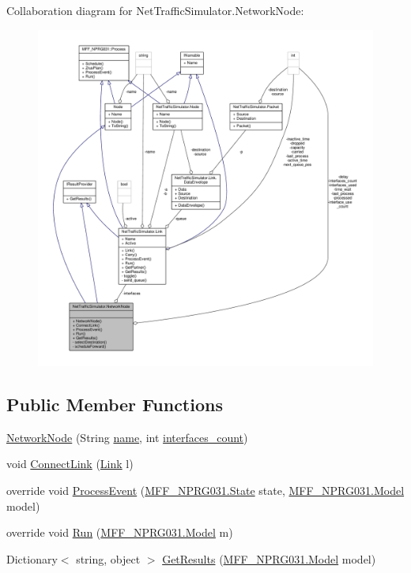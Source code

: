 Collaboration diagram for Net\-Traffic\-Simulator.\-Network\-Node\-:
\nopagebreak
\begin{figure}[H]
\begin{center}
\leavevmode
\includegraphics[width=350pt]{classNetTrafficSimulator_1_1NetworkNode__coll__graph}
\end{center}
\end{figure}
\subsection*{Public Member Functions}
\begin{DoxyCompactItemize}
\item 
\hyperlink{classNetTrafficSimulator_1_1NetworkNode_a72e36bcc5eb67db3e7354a01812fcbd9}{Network\-Node} (String \hyperlink{classNetTrafficSimulator_1_1Node_a679d5b6cca77c0cdb46cc98c347d4747}{name}, int \hyperlink{classNetTrafficSimulator_1_1NetworkNode_af9b9d881f9c1b02749716bb12efb5f66}{interfaces\-\_\-count})
\item 
void \hyperlink{classNetTrafficSimulator_1_1NetworkNode_a03e1d48e53fa9405411664e75792b5ec}{Connect\-Link} (\hyperlink{classNetTrafficSimulator_1_1Link}{Link} l)
\item 
override void \hyperlink{classNetTrafficSimulator_1_1NetworkNode_a4a629c1d159d4addef85742089506d20}{Process\-Event} (\hyperlink{classMFF__NPRG031_1_1State}{M\-F\-F\-\_\-\-N\-P\-R\-G031.\-State} state, \hyperlink{classMFF__NPRG031_1_1Model}{M\-F\-F\-\_\-\-N\-P\-R\-G031.\-Model} model)
\item 
override void \hyperlink{classNetTrafficSimulator_1_1NetworkNode_ac4210159f0193e7872d356f40f0b99fe}{Run} (\hyperlink{classMFF__NPRG031_1_1Model}{M\-F\-F\-\_\-\-N\-P\-R\-G031.\-Model} m)
\item 
Dictionary$<$ string, object $>$ \hyperlink{classNetTrafficSimulator_1_1NetworkNode_a7af0bcddea5c043f7e6ff2ac692e09f7}{Get\-Results} (\hyperlink{classMFF__NPRG031_1_1Model}{M\-F\-F\-\_\-\-N\-P\-R\-G031.\-Model} model)
\end{DoxyCompactItemize}
